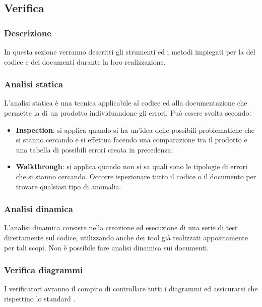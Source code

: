 \subsection{Verifica}
\subsubsection{Descrizione}
In questa sezione verranno descritti gli strumenti ed i metodi impiegati per la  del codice e dei documenti durante la loro realizzazione.
\subsubsection{Analisi statica}
L’analisi statica è una tecnica applicabile al codice ed alla documentazione che permette la  di un prodotto individuandone gli errori. Può essere svolta secondo:
\begin{itemize}
	\item \textbf{Inspection}: si applica quando si ha un’idea delle possibili problematiche che si stanno cercando e si effettua facendo una comparazione tra il prodotto e una tabella di possibili errori creata in precedenza;
	\item \textbf{Walkthrough}: si applica quando non si sa quali sono le tipologie di errori che si stanno cercando. Occorre ispezionare tutto il codice o il documento per trovare qualsiasi tipo di anomalia.
\end{itemize}
\subsubsection{Analisi dinamica}
L’analisi dinamica consiste nella creazione ed esecuzione di una serie di test direttamente sul codice, utilizzando anche dei tool già realizzati appositamente per tali scopi. Non è possibile fare analisi dinamica sui documenti.
\subsubsection{Verifica diagrammi }
I verificatori avranno il compito di controllare tutti i diagrammi  ed assicurarsi che rispettino lo standard .

